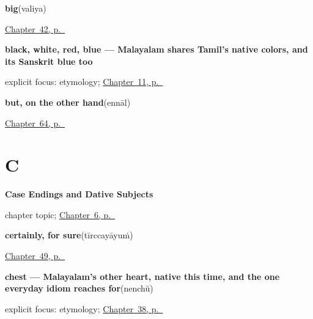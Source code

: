 \noindent\begin{minipage}[t]{\linewidth}
\raggedright
\textbf{big}\enspace\emph{}\enspace(valiya)\par
\footnotesize \hyperref[ch:ml-describing-things]{Chapter~42, p.~\pageref*{ch:ml-describing-things}}
\end{minipage}\par\smallskip

\noindent\begin{minipage}[t]{\linewidth}
\raggedright
\textbf{black, white, red, blue — Malayalam shares Tamil's native colors, and its Sanskrit blue too}\enspace\emph{   }\par
\footnotesize explicit focus: etymology; \hyperref[ch:ml-core-colours]{Chapter~11, p.~\pageref*{ch:ml-core-colours}}
\end{minipage}\par\smallskip

\noindent\begin{minipage}[t]{\linewidth}
\raggedright
\textbf{but, on the other hand}\enspace\emph{}\enspace(ennāl)\par
\footnotesize \hyperref[ch:ml-five-words-that-join]{Chapter~64, p.~\pageref*{ch:ml-five-words-that-join}}
\end{minipage}\par\smallskip

\section*{C}

\noindent\begin{minipage}[t]{\linewidth}
\raggedright
\textbf{Case Endings and Dative Subjects}\par
\footnotesize chapter topic; \hyperref[ch:ml-dative-case]{Chapter~6, p.~\pageref*{ch:ml-dative-case}}
\end{minipage}\par\smallskip

\noindent\begin{minipage}[t]{\linewidth}
\raggedright
\textbf{certainly, for sure}\enspace\emph{}\enspace(tīrccayāyuṁ)\par
\footnotesize \hyperref[ch:ml-replies]{Chapter~49, p.~\pageref*{ch:ml-replies}}
\end{minipage}\par\smallskip

\noindent\begin{minipage}[t]{\linewidth}
\raggedright
\textbf{chest — Malayalam's other heart, native this time, and the one everyday idiom reaches for}\enspace\emph{}\enspace(nenchŭ)\par
\footnotesize explicit focus: etymology; \hyperref[ch:ml-two-hearts]{Chapter~38, p.~\pageref*{ch:ml-two-hearts}}
\end{minipage}\par\smallskip

